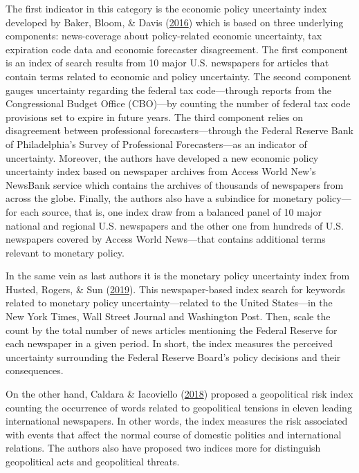 \documentclass[12pt,twoside]{reedthesis}
\begin{document}
The first indicator in this category is the economic policy uncertainty index developed by Baker, Bloom, \& Davis (\protect\hyperlink{ref-bakebloodavi:2016}{2016}) which is based on three underlying components: news-coverage about policy-related economic uncertainty, tax expiration code data and economic forecaster disagreement. The first component is an index of search results from 10 major U.S. newspapers for articles that contain terms related to economic and policy uncertainty. The second component gauges uncertainty regarding the federal tax code---through reports from the Congressional Budget Office (CBO)---by counting the number of federal tax code provisions set to expire in future years. The third component relies on disagreement between professional forecasters---through the Federal Reserve Bank of Philadelphia's Survey of Professional Forecasters---as an indicator of uncertainty. Moreover, the authors have developed a new economic policy uncertainty index based on newspaper archives from Access World New's NewsBank service which contains the archives of thousands of newspapers from across the globe. Finally, the authors also have a subindice for monetary policy---for each source, that is, one index draw from a balanced panel of 10 major national and regional U.S. newspapers and the other one from hundreds of U.S. newspapers covered by Access World News---that contains additional terms relevant to monetary policy.

In the same vein as last authors it is the monetary policy uncertainty index from Husted, Rogers, \& Sun (\protect\hyperlink{ref-hustrogesun:2019}{2019}). This newspaper-based index search for keywords related to monetary policy uncertainty---related to the United States---in the New York Times, Wall Street Journal and Washington Post. Then, scale the count by the total number of news articles mentioning the Federal Reserve for each newspaper in a given period. In short, the index measures the perceived uncertainty surrounding the Federal Reserve Board's policy decisions and their consequences.

On the other hand, Caldara \& Iacoviello (\protect\hyperlink{ref-caldiaco:2018}{2018}) proposed a geopolitical risk index counting the occurrence of words related to geopolitical tensions in eleven leading international newspapers. In other words, the index measures the risk associated with events that affect the normal course of domestic politics and international relations. The authors also have proposed two indices more for distinguish geopolitical acts and geopolitical threats.
\end{document}
